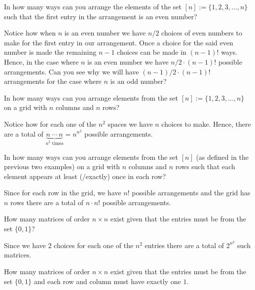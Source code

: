 \begin{question}
	In how many ways can you arrange the elements of the set $[n]:=\{1,2,3,\ldots,n\}$ such that the first entry in the arrangement is an even number?
	\label{q:1.1}
\end{question}
\begin{solution}
Notice how when $n$ is an even number we have $n/2$ choices of even numbers to make for the first entry in our arrangement. Once a choice for the said even number is made the remaining $n-1$ choices can be made in $\left( n-1 \right)!$ ways. Hence, in the case where $n$ is an even number we have $n/2 \cdot \left(n-1 \right)!$ possible arrangements. Can you see why we will have $\left( n-1 \right)/2 \cdot \left( n-1 \right)!$ arrangements for the case where $n$ is an odd number?
\end{solution}
\begin{question}
    In how many ways can you arrange elements from the set $[n]:=\{1,2,3,\ldots,n\}$ on a grid with $n$ columns and $n$ rows?
\end{question}
\begin{solution}
Notice how for each one of the $n^2$ spaces we have $n$ choices to make. Hence, there are a total of $\underbrace{n \ \cdots \ n}_{n^2 \text{ times}} = n^{n^2}$ possible arrangements.
\end{solution}
\begin{question}
In how many ways can you arrange elements from the set $[n]$ (as defined in the previous two examples) on a grid with $n$ columns and $n$ rows such that each element appears at least (/exactly) once in each row?
\end{question}
\begin{solution}
Since for each row in the grid, we have $n!$ possible arrangements and the grid has $n$ rows there are a total of $n\cdot n!$ possible arrangements.
\end{solution}
\begin{question}
How many matrices of order $n\times n$ exist given that the entries must be from the set $\{0,1\}$? 
\end{question}
\begin{solution}
Since we have $2$ choices for each one of the $n^2$ entries there are a total of $2^{n^2}$ such matrices.
\end{solution}
	\begin{question}
\label{q:1.5}
	How many matrices of order $n \times n$ exist given that the entries must be from the set $\{0,1\}$ and each row and column must have exactly one $1$.
\end{question}
